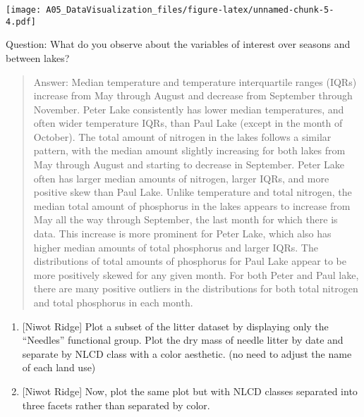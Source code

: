 \documentclass[]{article}
\begin{document}
\texttt{[image: A05\_DataVisualization\_files/figure-latex/unnamed-chunk-5-4.pdf]}

Question: What do you observe about the variables of interest over
seasons and between lakes?

\begin{quote}
Answer: Median temperature and temperature interquartile ranges (IQRs)
increase from May through August and decrease from September through
November. Peter Lake consistently has lower median temperatures, and
often wider temperature IQRs, than Paul Lake (except in the month of
October). The total amount of nitrogen in the lakes follows a similar
pattern, with the median amount slightly increasing for both lakes from
May through August and starting to decrease in September. Peter Lake
often has larger median amounts of nitrogen, larger IQRs, and more
positive skew than Paul Lake. Unlike temperature and total nitrogen, the
median total amount of phosphorus in the lakes appears to increase from
May all the way through September, the last month for which there is
data. This increase is more prominent for Peter Lake, which also has
higher median amounts of total phosphorus and larger IQRs. The
distributions of total amounts of phosphorus for Paul Lake appear to be
more positively skewed for any given month. For both Peter and Paul
lake, there are many positive outliers in the distributions for both
total nitrogen and total phosphorus in each month.
\end{quote}

\begin{enumerate}
\def\labelenumi{\arabic{enumi}.}
\setcounter{enumi}{5}
\item
  {[}Niwot Ridge{]} Plot a subset of the litter dataset by displaying
  only the ``Needles'' functional group. Plot the dry mass of needle
  litter by date and separate by NLCD class with a color aesthetic. (no
  need to adjust the name of each land use)
\item
  {[}Niwot Ridge{]} Now, plot the same plot but with NLCD classes
  separated into three facets rather than separated by color.
\end{enumerate}
\end{document}
